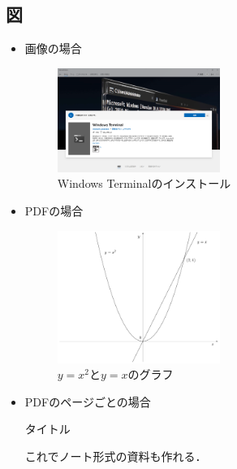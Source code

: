 \documentclass[11pt]{ltjsarticle}
\newcommand{\mysection}[1]{\textsf{#1}}
\begin{document}
\subsection{図}
\begin{itemize}
    \item 画像の場合
    \begin{figure}[H]
        \centering
        \includegraphics[width=0.5\textwidth]{./fig/install_terminal.png}
        \caption{Windows Terminalのインストール}
        \label{fig:install_terminal}
    \end{figure}
    \item PDFの場合
    \begin{figure}[H]
        \centering
        \includegraphics[width=0.5\textwidth]{./fig/graph.pdf}
        \caption{$y=x^2$と$y=x$のグラフ}
        \label{fig:graph1}
    \end{figure}
    \newpage
    \item PDFのページごとの場合
    \begin{figure}[H]
        \centering
    \end{figure}
    
    \noindent
    \mysection{タイトル}

    これでノート形式の資料も作れる．
\end{itemize}
\end{document}
